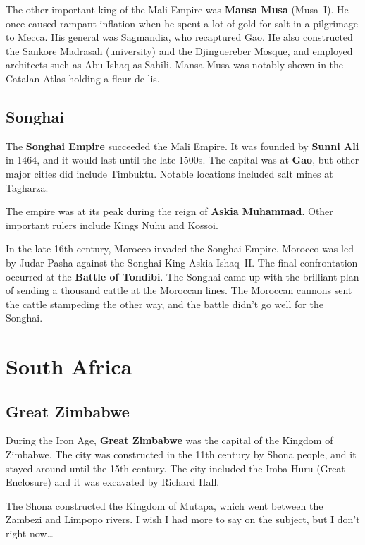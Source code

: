 The other important king of the Mali Empire was \textbf{Mansa Musa} (Musa~I).
He once caused rampant inflation when he spent a lot of gold for salt in a pilgrimage to Mecca.
His general was Sagmandia, who recaptured Gao.
He also constructed the Sankore Madrasah (university) and the Djinguereber Mosque,
and employed architects such as Abu Ishaq as-Sahili.
Mansa Musa was notably shown in the Catalan Atlas holding a fleur-de-lis.

\subsection*{Songhai}

The \textbf{Songhai Empire} succeeded the Mali Empire.
It was founded by \textbf{Sunni Ali} in 1464, and it would last until the late 1500s.
The capital was at \textbf{Gao}, but other major cities did include Timbuktu.
Notable locations included salt mines at Tagharza.

The empire was at its peak during the reign of \textbf{Askia Muhammad}.
Other important rulers include Kings Nuhu and Kossoi.

In the late 16th century, Morocco invaded the Songhai Empire.
Morocco was led by Judar Pasha against the Songhai King Askia Ishaq~II\@.
The final confrontation occurred at the \textbf{Battle of Tondibi}.
The Songhai came up with the brilliant plan of sending a thousand cattle at the Moroccan lines.
The Moroccan cannons sent the cattle stampeding the other way,
and the battle didn't go well for the Songhai.

\section{South Africa}

\subsection*{Great Zimbabwe}

During the Iron Age, \textbf{Great Zimbabwe} was the capital of the Kingdom of Zimbabwe.
The city was constructed in the 11th century by Shona people,
and it stayed around until the 15th century.
The city included the Imba Huru (Great Enclosure) and it was excavated by Richard Hall.

The Shona constructed the Kingdom of Mutapa, which went between the Zambezi and Limpopo rivers.
I wish I had more to say on the subject, but I don't right now\ldots{}
